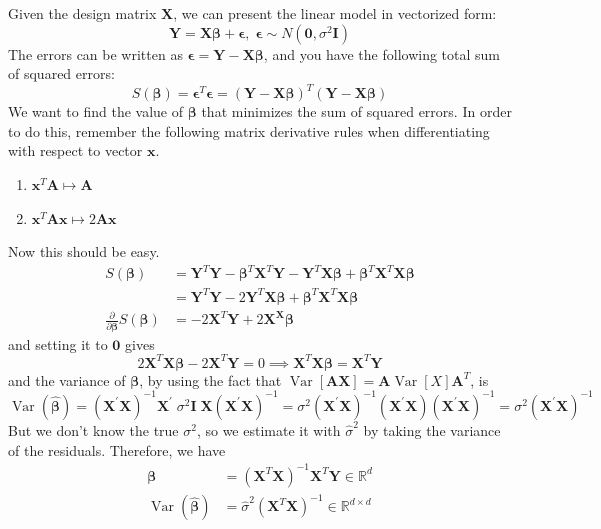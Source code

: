 \documentclass{article}
\DeclareMathOperator{\Var}{Var}
\theoremstyle{definition}
\theoremstyle{remark}
\theoremstyle{definition}
\begin{document}
Given the design matrix $\mathbf{X}$, we can present the linear model in vectorized form: 
\[\mathbf{Y} = \mathbf{X} \boldsymbol{\beta} + \boldsymbol{\epsilon}, \; \boldsymbol{\epsilon} \sim N(\mathbf{0}, \sigma^2 \mathbf{I})\]
The errors can be written as $\boldsymbol{\epsilon} = \mathbf{Y} - \mathbf{X} \boldsymbol{\beta}$, and you have the following total sum of squared errors: 
\[S(\boldsymbol{\beta}) = \boldsymbol{\epsilon}^T \boldsymbol{\epsilon} = (\mathbf{Y} - \mathbf{X} \boldsymbol{\beta})^T (\mathbf{Y} - \mathbf{X} \boldsymbol{\beta})\]
We want to find the value of $\boldsymbol{\beta}$ that minimizes the sum of squared errors. In order to do this, remember the following matrix derivative rules when differentiating with respect to vector $\mathbf{x}$. 
\begin{enumerate}
    \item $\mathbf{x}^T \mathbf{A} \mapsto \mathbf{A}$
    \item $\mathbf{x}^T \mathbf{A} \mathbf{x} \mapsto 2 \mathbf{A} \mathbf{x}$
\end{enumerate}
Now this should be easy. 
\begin{align*}
    S(\boldsymbol{\beta}) & = \mathbf{Y}^T \mathbf{Y} - \boldsymbol{\beta}^T \mathbf{X}^T \mathbf{Y} - \mathbf{Y}^T \mathbf{X} \boldsymbol{\beta} + \boldsymbol{\beta}^T \mathbf{X}^T \mathbf{X} \boldsymbol{\beta} \\
    & = \mathbf{Y}^T \mathbf{Y} - 2 \mathbf{Y}^T \mathbf{X} \boldsymbol{\beta} + \boldsymbol{\beta}^T \mathbf{X}^T \mathbf{X} \boldsymbol{\beta} \\
    \frac{\partial}{\partial \boldsymbol{\beta}} S(\boldsymbol{\beta}) & = - 2 \mathbf{X}^T \mathbf{Y} + 2 \mathbf{X}^ \mathbf{X} \boldsymbol{\beta}
\end{align*}
and setting it to $\mathbf{0}$ gives 
\[2 \mathbf{X}^T \mathbf{X} \boldsymbol{\beta} - 2 \mathbf{X}^T \mathbf{Y} = 0 \implies \mathbf{X}^T \mathbf{X} \boldsymbol{\beta} = \mathbf{X}^T \mathbf{Y}\]
and the variance of $\boldsymbol{\beta}$, by using the fact that $\Var[\mathbf{A} \mathbf{X}] = \mathbf{A} \Var[X] \mathbf{A}^T$, is
\[\Var(\hat{\boldsymbol{\beta}}) =
 (\mathbf{X}^{\prime} \mathbf{X})^{-1} \mathbf{X}^{\prime}
 \;\sigma^2 \mathbf{I} \; \mathbf{X}  (\mathbf{X}^{\prime} \mathbf{X})^{-1}
= \sigma^2 (\mathbf{X}^{\prime} \mathbf{X})^{-1} (\mathbf{X}^{\prime}
 \mathbf{X})  (\mathbf{X}^{\prime} \mathbf{X})^{-1}
= \sigma^2  (\mathbf{X}^{\prime} \mathbf{X})^{-1}\]
But we don't know the true $\sigma^2$, so we estimate it with $\hat{\sigma}^2$ by taking the variance of the residuals. Therefore, we have 
\begin{align*}
    \boldsymbol{\beta} & = (\mathbf{X}^T \mathbf{X})^{-1} \mathbf{X}^T \mathbf{Y} \in \mathbb{R}^d \\
    \Var(\hat{\boldsymbol{\beta}}) & = \hat{\sigma}^2 (\mathbf{X}^T \mathbf{X})^{-1} \in \mathbb{R}^{d \times d}
\end{align*}
\end{document}

